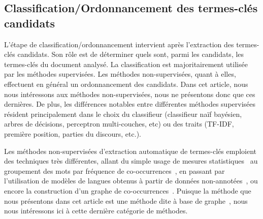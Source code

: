   \subsection{Classification/Ordonnancement des termes-clés candidats}
  \label{subsec:classification_ordonnancement_des_termes_cles_candidats}
    L'étape de classification/ordonnancement intervient après l'extraction des
    termes-clés candidats. Son rôle est de déterminer quels sont, parmi les
    candidats, les termes-clés du document analysé. La classification est
    majoritairement utilisée par les méthodes supervisées. Les méthodes
    non-supervisées, quant à elles,  effectuent en général un ordonnancement des
    candidats. Dans cet article, nous nous intéressons aux méthodes
    non-supervisées, nous ne présentons donc que ces dernières. De plus, les
    différences notables entre différentes méthodes supervisées résident
    principalement dans le choix du classifieur (classifieur naïf bayésien,
    arbres de décisions, perceptron multi-couches, etc) ou des traits (TF-IDF,
    première position, parties du discours, etc.).

    Les méthodes non-supervisées d'extraction automatique de termes-clés
    emploient des techniques très différentes, allant du simple usage de mesures
    statistiques~\cite{jones1972tfidf,paukkeri2010likey} au groupement des mots
    par fréquence de co-occurrences~\cite{liu2009keycluster}, en passant par
    l'utilisation de modèles de langues obtenus à partir de données
    non-annotées~\cite{tomokiyo2003languagemodel}, ou encore la construction
    d'un graphe de co-occurrences~\cite{mihalcea2004textrank}. Puisque la
    méthode que nous présentons dans cet article est une méthode dite
    \og à base de graphe~\fg, nous nous intéressons ici à cette dernière
    catégorie de méthodes.

